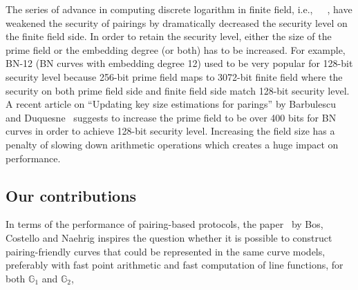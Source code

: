 The series of advance in computing discrete logarithm in finite field,
i.e.,~\cite{2016/KB}~\cite{2015/BGGM}~\cite{2015/BGK},
have weakened the security of pairings by dramatically decreased the security level on the finite field side.
In order to retain the security level, either the size of the prime field or the embedding degree (or both) has to be increased.
For example, BN-12 (BN curves with embedding degree 12) used to be very popular for 128-bit security level
because 256-bit prime field maps to 3072-bit finite field
where the security on both prime field side and finite field side match 128-bit security level.
A recent article on ``Updating key size estimations for parings'' by Barbulescu and Duquesne~\cite{2017/keysize}
suggests to increase the prime field to be over 400 bits for BN curves in order to achieve 128-bit security level.
Increasing the field size has a penalty of slowing down arithmetic operations which creates a huge impact on performance.



\subsection{Our contributions}

In terms of the performance of pairing-based protocols,
the paper~\cite{2013/bos-pairing} by Bos, Costello and Naehrig
inspires the question whether it is possible to
construct pairing-friendly curves that could be represented in the same curve models,
preferably with fast point arithmetic and fast computation of line functions,
for both $\mathbb{G}_1$ and $\mathbb{G}_2$,

